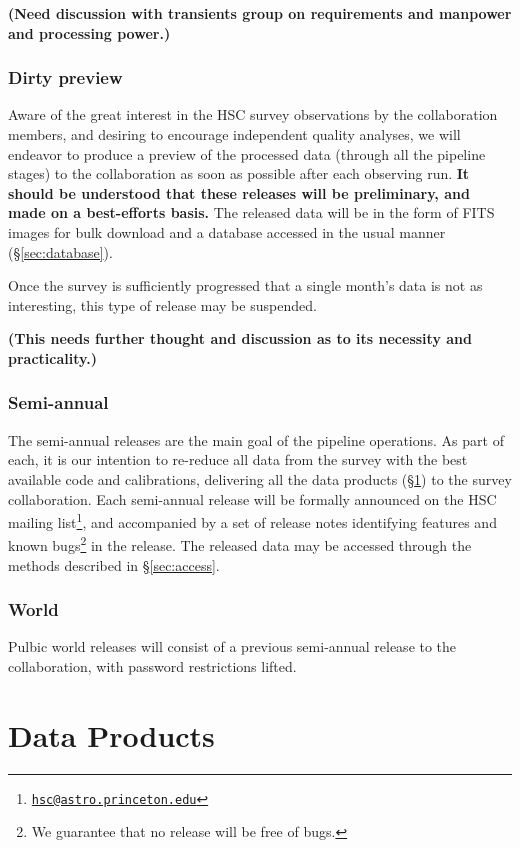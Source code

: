 \documentclass[12pt]{article}
\newcommand\tbd[1]{\textbf{\color{red}(#1)}}
\def\email#1{\href{mailto:#1}{\nolinkurl{#1}}}
\begin{document}
\tbd{Need discussion with transients group on requirements
and manpower and processing power.}

\subsubsection{Dirty preview}

Aware of the great interest in the HSC survey observations by the collaboration members, and desiring to
encourage independent quality analyses, we will endeavor to produce a preview of the processed data (through
all the pipeline stages) to the collaboration as soon as possible after each observing run.  {\bf It should
be understood that these releases will be preliminary, and made on a best-efforts basis.}  The released data
will be in the form of FITS images for bulk download and a database accessed in the usual manner
(\S\ref{sec:database}).

Once the survey is sufficiently progressed that a single month's data is not as interesting, this type of
release may be suspended.

\tbd{This needs further thought and discussion as to its necessity and practicality.}

\subsubsection{Semi-annual}

The semi-annual releases are the main goal of the pipeline operations.  As part of each, it is our intention to
re-reduce all data from the survey with the best available code and calibrations, delivering all the data
products (\S\ref{sec:products}) to the survey collaboration.  Each semi-annual release will be formally
announced on the HSC mailing list\footnote{\email{hsc@astro.princeton.edu}}, and accompanied by a set of
release notes identifying features and known bugs\footnote{We guarantee that no release will be free of bugs.}
in the release.  The released data may be accessed through the methods described in \S\ref{sec:access}.


\subsubsection{World}

Pulbic world releases will consist of a previous semi-annual release to the collaboration, with password
restrictions lifted.

\section{Data Products}
\label{sec:products}
\end{document}
